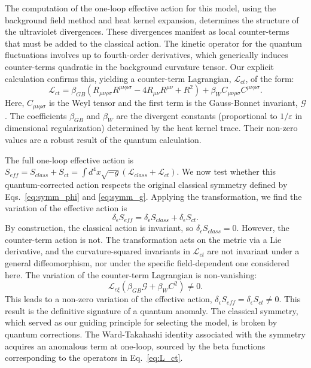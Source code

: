 \documentclass[twocolumn]{aastex631}
\begin{document}
The computation of the one-loop effective action for this model, using the background field method and heat kernel expansion, determines the structure of the ultraviolet divergences. These divergences manifest as local counter-terms that must be added to the classical action. The kinetic operator for the quantum fluctuations involves up to fourth-order derivatives, which generically induces counter-terms quadratic in the background curvature tensor. Our explicit calculation confirms this, yielding a counter-term Lagrangian, $\mathcal{L}_{ct}$, of the form:
\begin{equation}
\label{eq:L_ct}
\mathcal{L}_{ct} = \beta_{GB} \left( R_{\mu\nu\rho\sigma}R^{\mu\nu\rho\sigma} - 4 R_{\mu\nu}R^{\mu\nu} + R^2 \right) + \beta_{W} C_{\mu\nu\rho\sigma}C^{\mu\nu\rho\sigma}.
\end{equation}
Here, $C_{\mu\nu\rho\sigma}$ is the Weyl tensor and the first term is the Gauss-Bonnet invariant, $\mathcal{G}$. The coefficients $\beta_{GB}$ and $\beta_{W}$ are the divergent constants (proportional to $1/\varepsilon$ in dimensional regularization) determined by the heat kernel trace. Their non-zero values are a robust result of the quantum calculation.

The full one-loop effective action is $S_{eff} = S_{class} + S_{ct} = \int d^4x \sqrt{-g} (\mathcal{L}_{class} + \mathcal{L}_{ct})$. We now test whether this quantum-corrected action respects the original classical symmetry defined by Eqs.~\eqref{eq:symm_phi} and \eqref{eq:symm_g}. Applying the transformation, we find the variation of the effective action is
\begin{equation}
    \delta_\epsilon S_{eff} = \delta_\epsilon S_{class} + \delta_\epsilon S_{ct}.
\end{equation}
By construction, the classical action is invariant, so $\delta_\epsilon S_{class} = 0$. However, the counter-term action is not. The transformation acts on the metric via a Lie derivative, and the curvature-squared invariants in $\mathcal{L}_{ct}$ are not invariant under a general diffeomorphism, nor under the specific field-dependent one considered here. The variation of the counter-term Lagrangian is non-vanishing:
\begin{equation}
    \mathcal{L}_{\epsilon \xi} \left( \beta_{GB} \mathcal{G} + \beta_{W} C^2 \right) \neq 0.
\end{equation}
This leads to a non-zero variation of the effective action, $\delta_\epsilon S_{eff} = \delta_\epsilon S_{ct} \neq 0$. This result is the definitive signature of a quantum anomaly. The classical symmetry, which served as our guiding principle for selecting the model, is broken by quantum corrections. The Ward-Takahashi identity associated with the symmetry acquires an anomalous term at one-loop, sourced by the beta functions corresponding to the operators in Eq.~\eqref{eq:L_ct}.
\end{document}

